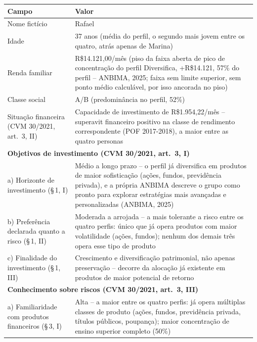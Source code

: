 \begin{quadro}[htbp]
  \centering
  \small
  \caption{Persona 4 -- Perfil Diversifica (17\% da popula\c{c}\~ao)}
  \label{qua:persona-diversifica}
  \begin{tabular}{p{5cm}p{8cm}}
    \toprule
    \textbf{Campo} & \textbf{Valor} \\
    \midrule
    Nome fict\'icio & Rafael \\
    Idade & 37 anos (m\'edia do perfil, o segundo mais jovem entre os quatro, atr\'as apenas de Marina) \\
    Renda familiar & R\$14.121,00/m\^es (piso da faixa aberta de pico de concentra\c{c}\~ao do perfil Diversifica, +R\$14.121, 57\% do perfil -- ANBIMA, 2025; faixa sem limite superior, sem ponto m\'edio calcul\'avel, por isso ancorada no piso) \\
    Classe social & A/B (predomin\^ancia no perfil, 52\%) \\
    Situa\c{c}\~ao financeira (CVM 30/2021, art.\ 3\textordmasculine{}, II) & Capacidade de investimento de R\$1.954,22/m\^es -- superavit financeiro positivo na classe de rendimento correspondente (POF 2017-2018), a maior entre as quatro personas \\
    \multicolumn{2}{l}{\textbf{Objetivos de investimento (CVM 30/2021, art.\ 3\textordmasculine{}, I)}} \\
    \quad a) Horizonte de investimento (\S\,1\textordmasculine{}, I) & M\'edio a longo prazo -- o perfil j\'a diversifica em produtos de maior sofistica\c{c}\~ao (a\c{c}\~oes, fundos, previd\^encia privada), e a pr\'opria ANBIMA descreve o grupo como pronto para explorar estrat\'egias mais avan\c{c}adas e personalizadas (ANBIMA, 2025) \\
    \quad b) Prefer\^encia declarada quanto a risco (\S\,1\textordmasculine{}, II) & Moderada a arrojada -- a mais tolerante a risco entre os quatro perfis: \'unico que j\'a opera produtos com maior volatilidade (a\c{c}\~oes, fundos); nenhum dos demais tr\^es opera esse tipo de produto \\
    \quad c) Finalidade do investimento (\S\,1\textordmasculine{}, III) & Crescimento e diversifica\c{c}\~ao patrimonial, n\~ao apenas preserva\c{c}\~ao -- decorre da aloca\c{c}\~ao j\'a existente em produtos de maior potencial de retorno \\
    \multicolumn{2}{l}{\textbf{Conhecimento sobre riscos (CVM 30/2021, art.\ 3\textordmasculine{}, III)}} \\
    \quad a) Familiaridade com produtos financeiros (\S\,3\textordmasculine{}, I) & Alta -- a maior entre os quatro perfis: j\'a opera m\'ultiplas classes de produto (a\c{c}\~oes, fundos, previd\^encia privada, t\'itulos p\'ublicos, poupan\c{c}a); maior concentra\c{c}\~ao de ensino superior completo (50\%) \\

\end{tabular}
\end{quadro}
